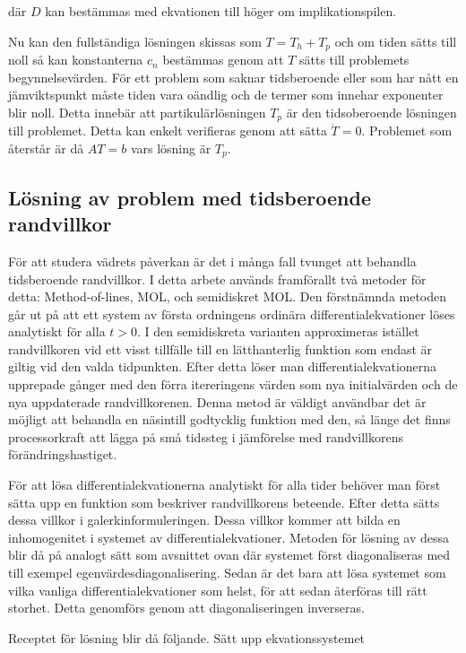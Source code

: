 där $D$ kan bestämmas med ekvationen till höger om implikationspilen.

Nu kan den fullständiga lösningen skissas som $T = T_h + T_p$ och om
tiden sätts till noll så kan konstanterna $c_n$ bestämmas genom
att $T$ sätts till problemets begynnelsevärden. För ett problem som
saknar tidsberoende eller som har nått en jämviktspunkt måste
tiden vara oändlig och de termer som innehar exponenter blir noll.
Detta innebär att partikulärlösningen $T_p$ är den tidsoberoende lösningen
till problemet. Detta kan enkelt verifieras genom att sätta $\dot{T} = 0$.
Problemet som återstår är då $AT = b$ vars lösning är $T_p$.

\subsection{Lösning av problem med tidsberoende randvillkor}
\label{subsec:mol}

För att studera vädrets påverkan är det i många fall tvunget att behandla
tidsberoende randvillkor. I detta arbete används framförallt två metoder för detta:
Method-of-lines, MOL, och semidiskret MOL. Den förstnämnda metoden går ut på att
ett system av första ordningens ordinära differentialekvationer löses analytiskt för
alla $t>0$. I den semidiskreta varianten approximeras istället randvillkoren vid
ett visst tillfälle till en lätthanterlig funktion som endast är giltig vid
den valda tidpunkten. Efter detta löser man differentialekvationerna upprepade gånger
med den förra itereringens värden som nya initialvärden och de nya uppdaterade
randvillkorenen. Denna metod är väldigt användbar det är möjligt att behandla en näsintill godtycklig
funktion med den, så länge det finns  processorkraft att lägga på små tidssteg i jämförelse med
randvillkorens förändringshastiget.

För att lösa differentialekvationerna analytiskt för alla tider behöver man först
sätta upp en funktion som beskriver randvillkorens beteende. Efter detta sätts
dessa villkor i galerkinformuleringen. Dessa villkor kommer att bilda en inhomogenitet
i systemet av differentialekvationer. Metoden för lösning av dessa blir då på analogt sätt
som avsnittet ovan där systemet först diagonaliseras med till exempel egenvärdesdiagonalisering. Sedan är det bara att lösa systemet som vilka vanliga differentialekvationer som helst, för att sedan
återföras till rätt storhet. Detta genomförs genom att diagonaliseringen inverseras.

Receptet för lösning blir då följande. Sätt upp ekvationssystemet

